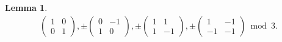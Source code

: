 \documentclass[12pt]{article}
\theoremstyle{definition}
\newtheorem{lemma}[theorem]{Lemma}
\numberwithin{equation}{section}
\numberwithin{theorem}{section}
\begin{document}
\begin{lemma}
{\begin{align*}
\begin{pmatrix}
1 & 0 \\
0 & 1
\end{pmatrix}, 
\pm
\begin{pmatrix}
0 & -1 \\
1 & 0
\end{pmatrix}, 
\pm
\begin{pmatrix}
1 & 1 \\
1 & -1
\end{pmatrix},  
\pm
\begin{pmatrix}
1 & -1 \\
-1 & -1
\end{pmatrix}
\bmod{3}.   %
\end{align*}
}
\end{lemma}
\end{document}
